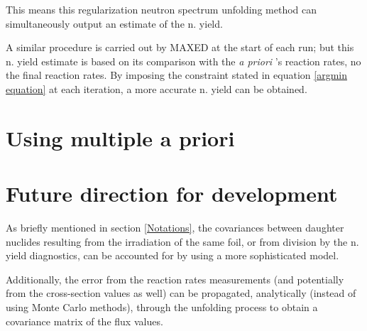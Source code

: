 \documentclass[a4paper, 12pt]{article}
\newcommand{\apriori}[0]{\textit{a priori} }
\begin{document}
This means this regularization neutron spectrum unfolding method can simultaneously output an estimate of the n. yield.

A similar procedure is carried out by MAXED at the start of each run; but this n. yield estimate is based on its comparison with the \apriori's reaction rates, no the final reaction rates. By imposing the constraint stated in equation \ref{argmin equation} at each iteration, a more accurate n. yield can be obtained.

\section{Using multiple a priori}

\section{Future direction for development}
As briefly mentioned in section \ref{Notations}, the covariances between daughter nuclides resulting from the irradiation of the same foil, or from division by the n. yield diagnostics, can be accounted for by using a more sophisticated model.

Additionally, the error from the reaction rates measurements (and potentially from the cross-section values as well) can be propagated, analytically (instead of using Monte Carlo methods), through the unfolding process to obtain a covariance matrix of the flux values.





\end{document}
